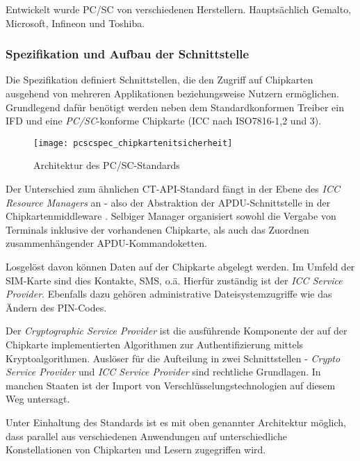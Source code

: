 Entwickelt wurde PC/SC von verschiedenen Herstellern. Hauptsächlich
Gemalto, Microsoft, Infineon und Toshiba.

\subsubsection[Spezifikation und Aufbau der Schnittstelle (Schenkel)]{Spezifikation und Aufbau der Schnittstelle}
Die Spezifikation definiert Schnittstellen, die den Zugriff auf Chipkarten ausgehend
von mehreren Applikationen beziehungsweise Nutzern ermöglichen. Grundlegend
dafür benötigt werden neben dem Standardkonformen Treiber ein \ac{IFD} und
eine \textit{PC/SC}-konforme Chipkarte (\ac{ICC} nach ISO7816-1,2 und 3).

 \begin{figure}[htp]
  \begin{center}
   \texttt{[image: pcscspec\_chipkartenitsicherheit]}
  \end{center}
  \caption[Architektur des PC/SC-Standards]{Architektur des PC/SC-Standards \cite{spitz11}}
  \label{abb:architektur_pcsc}
 \end{figure}

Der Unterschied zum ähnlichen CT-API-Standard fängt in der Ebene
des \textit{ICC Resource Managers} an - also der Abstraktion der
APDU-Schnittstelle in der Chipkartenmiddleware \cite{spitz11}.
Selbiger Manager organisiert sowohl die Vergabe von Terminals inklusive
der vorhandenen Chipkarte, als auch das Zuordnen zusammenhängender
APDU-Kommandoketten.

Losgelöst davon können Daten auf der Chipkarte abgelegt werden. Im Umfeld
der SIM-Karte sind dies Kontakte, SMS, o.ä. Hierfür zuständig ist der
\textit{ICC Service Provider}. Ebenfalls dazu gehören administrative Dateisystemzugriffe
wie das Ändern des PIN-Codes.

Der \textit{Cryptographic Service Provider} ist die ausführende Komponente
der auf der Chipkarte implementierten Algorithmen zur Authentifizierung mittels
Kryptoalgorithmen. Auslöser für die Aufteilung in zwei Schnittstellen -
\textit{Crypto Service Provider} und \textit{ICC Service Provider} sind
rechtliche Grundlagen. In manchen Staaten ist der Import von
Verschlüsselungstechnologien auf diesem Weg untersagt.

Unter Einhaltung des Standards ist es mit oben genannter Architektur möglich,
dass parallel aus verschiedenen Anwendungen auf unterschiedliche Konstellationen
von Chipkarten und Lesern zugegriffen wird.

